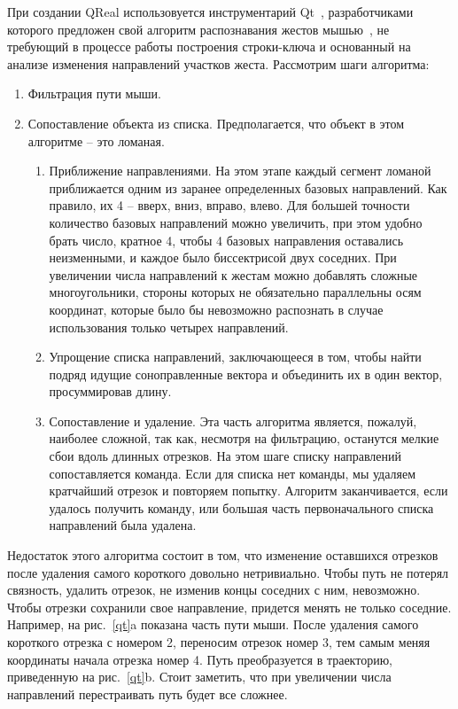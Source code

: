 \documentclass[a5paper]{article}
\begin{document}
При создании QReal использовуется инструментарий Qt~\cite{qt}, разработчиками которого предложен свой алгоритм распознавания жестов мышью~\cite{qtGestures},
не требующий в процессе работы построения строки-ключа и основанный на анализе изменения направлений участков жеста. Рассмотрим шаги алгоритма:
\begin{enumerate}
  \item Фильтрация пути мыши.
  \item Сопоставление объекта из списка. Предполагается, что объект в этом алгоритме -- это ломаная.
  \begin{enumerate}
    \item Приближение направлениями. На этом этапе каждый сегмент ломаной приближается одним из заранее определенных базовых направлений. 
Как правило, их 4 – вверх, вниз, вправо, влево. Для большей точности количество базовых направлений можно увеличить, при этом удобно 
брать число, кратное 4, чтобы 4 базовых направления оставались неизменными, и каждое было биссектрисой двух соседних. При увеличении числа 
направлений к жестам можно добавлять сложные многоугольники, стороны которых не обязательно параллельны осям координат, которые было бы 
невозможно распознать в случае использования только четырех направлений.
    \item Упрощение списка направлений, заключающееся в том, чтобы найти подряд идущие соноправленные вектора и объединить их в 
один вектор, просуммировав длину.
    \item Сопоставление и удаление. Эта часть алгоритма является, пожалуй, наиболее сложной, так как, несмотря на фильтрацию, останутся 
мелкие сбои вдоль длинных отрезков. На этом шаге списку направлений сопоставляется команда. Если для списка нет команды, мы удаляем 
кратчайший отрезок и повторяем попытку. Алгоритм заканчивается, если удалось получить команду, или большая часть первоначального списка 
направлений была удалена.
  \end{enumerate}
\end{enumerate}

Недостаток этого алгоритма состоит в том, что изменение оставшихся отрезков после удаления самого короткого довольно нетривиально. 
Чтобы путь не потерял связность, удалить отрезок, не изменив концы соседних с ним, невозможно. Чтобы отрезки сохранили свое направление, 
придется менять не только соседние. Например, на рис.~\ref{qt}a показана часть пути мыши. После удаления самого короткого отрезка с номером 2, 
переносим отрезок номер 3, тем самым меняя координаты начала отрезка номер 4. Путь преобразуется в траекторию, приведенную на рис.~\ref{qt}b.
Стоит заметить, что при увеличении числа направлений перестраивать путь будет все сложнее. 
\end{document}
